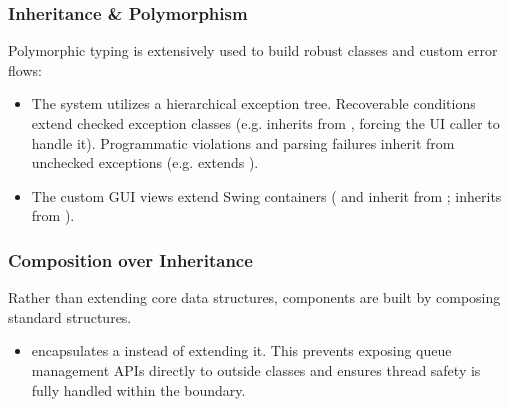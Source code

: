 \subsubsection{Inheritance \& Polymorphism}
Polymorphic typing is extensively used to build robust classes and custom error flows:
\begin{itemize}
    \item The system utilizes a hierarchical exception tree. Recoverable conditions extend checked exception classes (e.g.  inherits from , forcing the UI caller to handle it). Programmatic violations and parsing failures inherit from unchecked exceptions (e.g.  extends ).
    \item The custom GUI views extend Swing containers ( and  inherit from ;  inherits from ).
\end{itemize}

\subsubsection{Composition over Inheritance}
Rather than extending core data structures, components are built by composing standard structures.
\begin{itemize}
    \item {} encapsulates a  instead of extending it. This prevents exposing queue management APIs directly to outside classes and ensures thread safety is fully handled within the  boundary.
\end{itemize}

